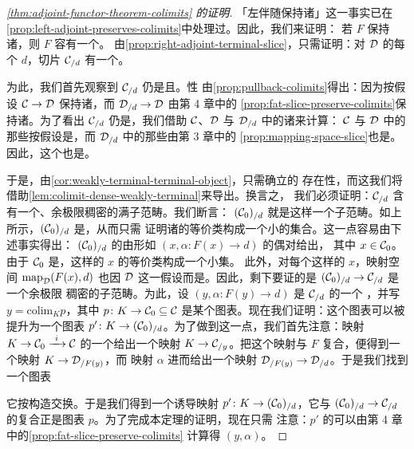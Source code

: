 \begin{proof}[\cref{thm:adjoint-functor-theorem-colimits} 的证明]
「左伴随保持诸\trColimit{}」这一事实已在\cref{prop:left-adjoint-preserves-colimits}中处理过。因此，我们来证明：
若 $F$ 保持诸\trColimit{}，则 $F$ 容有一个\trRightAdjoint{}。
由\cref{prop:right-adjoint-terminal-slice}，只需证明：对 $\mathcal{D}$ 的每个\trObject{}%
$d$，切片 $\mathcal{C}_{/d}$ 有一个\trTerminalObject{}。

为此，我们首先观察到 $\mathcal{C}_{/d}$ 仍是\trLocallySmall{}且\trCocomplete{}。\trCocomplete{}性
由\cref{prop:pullback-colimits}得出：因为按假设\trFunctor{} $\mathcal{C} \to \mathcal{D}$ 保持诸\trColimit{}，而%
\trFunctor{} $\mathcal{D}_{/d} \to \mathcal{D}$ 由第 4 章中的%
\cref{prop:fat-slice-preserve-colimits}保持诸\trColimit{}。为了看出 $\mathcal{C}_{/d}$
仍是\trLocallySmall{}，我们借助 $\mathcal{C}$、$\mathcal{D}$ 与 $\mathcal{D}_{/d}$ 中的诸\trMappingSpace{}来计算：
$\mathcal{C}$ 与 $\mathcal{D}$ 中的那些按假设是\trEssentiallySmall{}，而 $\mathcal{D}_{/d}$ 中的那些由第 3 章中的%
\cref{prop:mapping-space-slice}也是\trEssentiallySmall{}。因此，这个\trPullback{}也是\trEssentiallySmall{}。

于是，由\cref{cor:weakly-terminal-terminal-object}，只需确立\trWeaklyTerminal{}\trObject{}的
存在性，而这我们将借助\cref{lem:colimit-dense-weakly-terminal}来导出。换言之，
我们必须证明：$\mathcal{C}_{/d}$ 含有一个\trEssentiallySmall{}、余极限稠密的满子范畴。我们断言：
$(\mathcal{C}_0)_{/d}$ 就是这样一个子范畴。如上所示，$(\mathcal{C}_0)_{/d}$ 是\trLocallySmall{}，从而只需
证明诸\trObject{}的等价类构成一个小的集合。这一点容易由下述事实得出：
$(\mathcal{C}_0)_{/d}$ 的\trObject{}由形如 $(x, \alpha\colon F(x) \to d)$ 的偶对给出，
其中 $x \in \mathcal{C}_0$。由于 $\mathcal{C}_0$ 是\trEssentiallySmall{}，这样的 $x$ 的等价类构成一个小集。
此外，对每个这样的 $x$，映射空间 $\mathrm{map}_{\mathcal{D}}(F(x), d)$ 也因 $\mathcal{D}$ \trLocallySmall{}%
这一假设而是\trEssentiallySmall{}。因此，剩下要证的是 $(\mathcal{C}_0)_{/d} \to \mathcal{C}_{/d}$ 是一个余极限
稠密的子范畴。为此，设 $(y, \alpha\colon F(y) \to d)$ 是 $\mathcal{C}_{/d}$ 的一个%
\trObject{}，并写 $y = \mathrm{colim}_K p$，其中 $p\colon K \to \mathcal{C}_0 \subseteq \mathcal{C}$
是某个图表。现在我们证明：这个图表可以被提升为一个图表
$p'\colon K \to (\mathcal{C}_0)_{/d}$。为了做到这一点，我们首先注意：映射
$K \to \mathcal{C}_0 \xrightarrow{\ i\ } \mathcal{C}$ 的一个\trColimit{}\trCone{}给出一个映射
$K \to \mathcal{C}_{/y}$。把这个映射与 $F$ 复合，便得到一个映射 $K \to \mathcal{D}_{/F(y)}$，而
映射 $\alpha$ 进而给出一个映射 $\mathcal{D}_{/F(y)} \to \mathcal{D}_{/d}$。于是我们找到一个图表
\begin{center}
\end{center}
它按构造交换。于是我们得到一个诱导映射 $p'\colon K \to (\mathcal{C}_0)_{/d}$，它与
$(\mathcal{C}_0)_{/d} \to \mathcal{C}_{/d}$ 的复合正是图表 $p$。为了完成本定理的证明，现在只需
注意：$p'$ 的\trColimit{}可以由第 4 章中的\cref{prop:fat-slice-preserve-colimits}
计算得 $(y, \alpha)$。
\end{proof}

